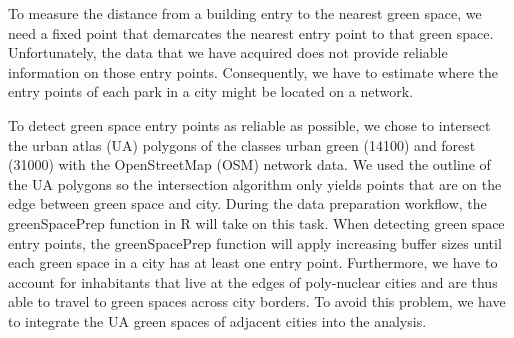 \documentclass[10pt]{article}
\begin{document}
To measure the distance from a building entry to the nearest green space, we need a fixed point that demarcates the nearest entry point to that green space.
Unfortunately, the data that we have acquired does not provide reliable information on those entry points.
Consequently, we have to estimate where the entry points of each park in a city might be located on a network.

To detect green space entry points as reliable as possible, we chose to intersect the urban atlas (UA) polygons of the classes urban green (14100) and forest (31000) with the OpenStreetMap (OSM) network data.
We used the outline of the UA polygons so the intersection algorithm only yields points that are on the edge between green space and city.
During the data preparation workflow, the greenSpacePrep function in R will take on this task.
When detecting green space entry points, the greenSpacePrep function will apply increasing buffer sizes until each green space in a city has at least one entry point.  
Furthermore, we have to account for inhabitants that live at the edges of poly-nuclear cities and are thus able to travel to green spaces across city borders.
To avoid this problem, we have to integrate the UA green spaces of adjacent cities into the analysis.
\end{document}
